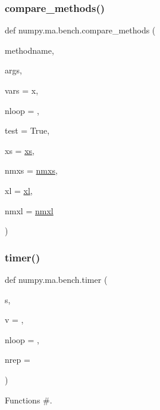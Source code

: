 \subsubsection{\texorpdfstring{compare\+\_\+methods()}{compare\_methods()}}
{\footnotesize\ttfamily def numpy.\+ma.\+bench.\+compare\+\_\+methods (\begin{DoxyParamCaption}\item[{}]{methodname,  }\item[{}]{args,  }\item[{}]{vars = {\ttfamily \textquotesingle{}x\textquotesingle{}},  }\item[{}]{nloop = {},  }\item[{}]{test = {\ttfamily True},  }\item[{}]{xs = {\ttfamily \hyperlink{namespacenumpy_1_1ma_1_1bench_abbf981f32817a2dc4ec6406bf324035a}{xs}},  }\item[{}]{nmxs = {\ttfamily \hyperlink{namespacenumpy_1_1ma_1_1bench_ade94ef9dc31fe069bf5d359e7280e523}{nmxs}},  }\item[{}]{xl = {\ttfamily \hyperlink{namespacenumpy_1_1ma_1_1bench_aa633d91568b1f05d8931d11d0732e618}{xl}},  }\item[{}]{nmxl = {\ttfamily \hyperlink{namespacenumpy_1_1ma_1_1bench_a8fcb5f226ee57f4211051c4f3103d7e7}{nmxl}} }\end{DoxyParamCaption})}

\mbox{\label{namespacenumpy_1_1ma_1_1bench_a774e2f21255c97dd4f461526ac75e9aa}} 
\subsubsection{\texorpdfstring{timer()}{timer()}}
{\footnotesize\ttfamily def numpy.\+ma.\+bench.\+timer (\begin{DoxyParamCaption}\item[{}]{s,  }\item[{}]{v = {\ttfamily \textquotesingle{}\textquotesingle{}},  }\item[{}]{nloop = {},  }\item[{}]{nrep = {} }\end{DoxyParamCaption})}



Functions \#. 



